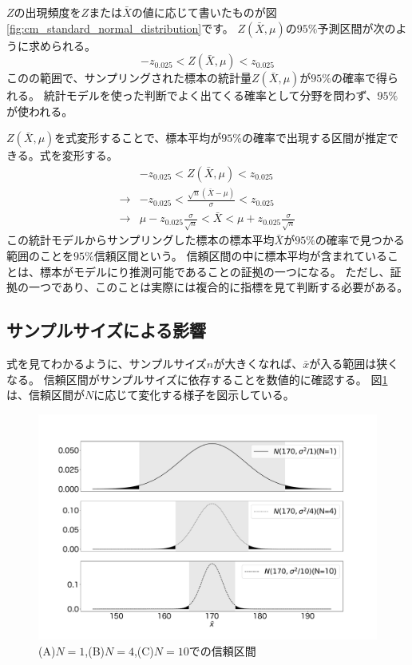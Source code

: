 $Z$の出現頻度を$Z$または$\bar{X}$の値に応じて書いたものが図\ref{fig:cm_standard_normal_distribution}です。
$Z(\bar{X},\mu)$の$95\%$予測区間が次のように求められる。
$$
-z_{0.025}<Z(\bar{X},\mu)<z_{0.025}
$$
このの範囲で、サンプリングされた標本の統計量$Z(\bar{X},\mu)$が$95\%$の確率で得られる。
統計モデルを使った判断でよく出てくる確率として分野を問わず、$95\%$が使われる。


$Z(\bar{X},\mu)$を式変形することで、標本平均が$95\%$の確率で出現する区間が推定できる。式を変形する。
\begin{eqnarray*}
    & -z_{0.025} < Z(\bar{X},\mu)<z_{0.025} \\
\rightarrow & -z_{0.025} < \frac{\sqrt{n}(\bar{X}-\mu)}{\sigma}  <z_{0.025} \\
\rightarrow & \mu - z_{0.025} \frac{\sigma}{\sqrt{n}} < \bar{X} < \mu + z_{0.025} \frac{\sigma}{\sqrt{n}}
\end{eqnarray*}
この統計モデルからサンプリングした標本の標本平均$\bar{X}$が$95\%$の確率で見つかる範囲のことを$95\%$信頼区間という。
信頼区間の中に標本平均が含まれていることは、標本がモデルにり推測可能であることの証拠の一つになる。
ただし、証拠の一つであり、このことは実際には複合的に指標を見て判断する必要がある。


\subsection{サンプルサイズによる影響}
式を見てわかるように、サンプルサイズ$n$が大きくなれば、$\bar{x}$が入る範囲は狭くなる。
信頼区間がサンプルサイズに依存することを数値的に確認する。
図\ref{fig:confidence_interval_n}は、信頼区間が$N$に応じて変化する様子を図示している。


\begin{figure}
\begin{center}
    \includegraphics[width=15cm]{./image/03_/confidence_interval.pdf}
    \caption{(A)$N=1$,(B)$N=4$,(C)$N=10$での信頼区間}
    \label{fig:confidence_interval_n}
  \end{center}
\end{figure}

